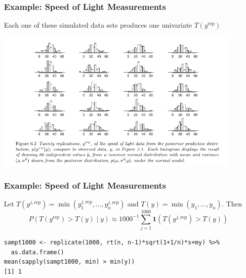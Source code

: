 \documentclass{beamer}
\begin{document}
\begin{frame}
\frametitle{Example: Speed of Light Measurements}

Each one of these simulated data sets produces one univariate $T(y^{\text{rep}})$
\begin{center}
\includegraphics[width=120mm]{sim_data_sets.png}
\end{center}

\end{frame}


\begin{frame}[fragile]
\frametitle{Example: Speed of Light Measurements}

Let $T(y^{j,\text{rep}}) = \min(y_1^{j,\text{rep}}, \ldots, y_n^{j,\text{rep}})$ and $T(y) = \min(y_1, \ldots, y_n)$. Then
\[
P(T(y^{\text{rep}}) > T(y) \mid y)  \approx 1000^{-1} \sum_{j=1}^{1000} \mathbf{1}\left(T(y^{j,\text{rep}}) > T(y) \right)
\]

\begin{verbatim}
sampt1000 <- replicate(1000, rt(n, n-1)*sqrt(1+1/n)*s+my) %>%
  as.data.frame()
mean(sapply(sampt1000, min) > min(y))
[1] 1
\end{verbatim}

\end{frame}
\end{document}
